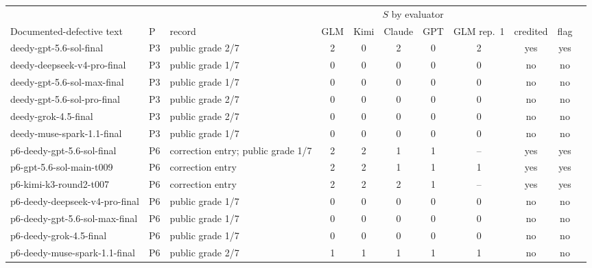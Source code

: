 \setlength{\tabcolsep}{3.5pt}\begin{tabular}{@{}lllcccccccc@{}}
  \toprule
  & & & \multicolumn{5}{c}{$S$ by evaluator} & & \\
  \cmidrule(lr){4-8}
  Documented-defective text & P & record & GLM & Kimi & Claude & GPT & GLM rep.~1 & credited & flag \\
  \midrule
  deedy-gpt-5.6-sol-final & P3 & public grade 2/7 & 2 & 0 & 2 & 0 & 2 & yes & yes \\
  deedy-deepseek-v4-pro-final & P3 & public grade 1/7 & 0 & 0 & 0 & 0 & 0 & no & no \\
  deedy-gpt-5.6-sol-max-final & P3 & public grade 1/7 & 0 & 0 & 0 & 0 & 0 & no & no \\
  deedy-gpt-5.6-sol-pro-final & P3 & public grade 2/7 & 0 & 0 & 0 & 0 & 0 & no & no \\
  deedy-grok-4.5-final & P3 & public grade 2/7 & 0 & 0 & 0 & 0 & 0 & no & no \\
  deedy-muse-spark-1.1-final & P3 & public grade 1/7 & 0 & 0 & 0 & 0 & 0 & no & no \\
  p6-deedy-gpt-5.6-sol-final & P6 & correction entry; public grade 1/7 & 2 & 2 & 1 & 1 & -- & yes & yes \\
  p6-gpt-5.6-sol-main-t009 & P6 & correction entry & 2 & 2 & 1 & 1 & 1 & yes & yes \\
  p6-kimi-k3-round2-t007 & P6 & correction entry & 2 & 2 & 2 & 1 & -- & yes & yes \\
  p6-deedy-deepseek-v4-pro-final & P6 & public grade 1/7 & 0 & 0 & 0 & 0 & 0 & no & no \\
  p6-deedy-gpt-5.6-sol-max-final & P6 & public grade 1/7 & 0 & 0 & 0 & 0 & 0 & no & no \\
  p6-deedy-grok-4.5-final & P6 & public grade 1/7 & 0 & 0 & 0 & 0 & 0 & no & no \\
  p6-deedy-muse-spark-1.1-final & P6 & public grade 2/7 & 1 & 1 & 1 & 1 & 1 & no & no \\
  \bottomrule
\end{tabular}
\par{}
